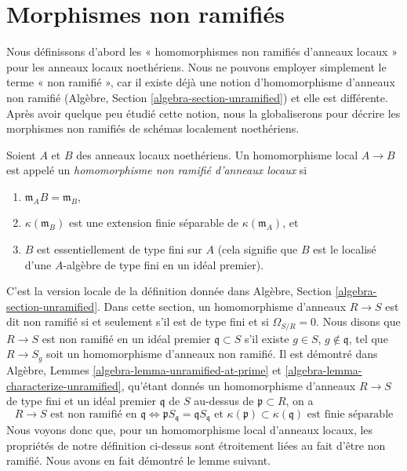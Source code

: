 \section{Morphismes non ramifiés}
\label{section-unramified-definition}

\noindent
Nous définissons d'abord les « homomorphismes non ramifiés d'anneaux locaux » pour les anneaux
locaux noethériens. Nous ne pouvons employer simplement le terme « non ramifié », car il existe déjà
une notion
d'homomorphisme d'anneaux non ramifié (Algèbre, Section \ref{algebra-section-unramified})
et elle est différente. Après avoir quelque peu étudié cette notion, nous
la globaliserons pour décrire les morphismes non ramifiés de schémas localement noethériens.

\begin{definition}
\label{definition-unramified-rings}
Soient $A$ et $B$ des anneaux locaux noethériens. Un homomorphisme local $A \to B$
est appelé un {\it homomorphisme non ramifié d'anneaux locaux} si
\begin{enumerate}
\item $\mathfrak m_AB = \mathfrak m_B$,
\item $\kappa(\mathfrak m_B)$ est une extension finie séparable de
$\kappa(\mathfrak m_A)$, et
\item $B$ est essentiellement de type fini sur $A$ (cela signifie
que $B$ est le localisé d'une $A$-algèbre de type fini en un idéal premier).
\end{enumerate}
\end{definition}

\noindent
C'est la version locale de la
définition donnée dans Algèbre, Section \ref{algebra-section-unramified}.
Dans cette section, un homomorphisme d'anneaux $R \to S$ est dit non ramifié si et
seulement s'il est de type fini et si $\Omega_{S/R} = 0$.
Nous disons que $R \to S$ est non ramifié en un idéal premier $\mathfrak q \subset S$
s'il existe $g \in S$, $g \not \in \mathfrak q$, tel que
$R \to S_g$ soit un homomorphisme d'anneaux non ramifié. Il est démontré dans
Algèbre, Lemmes \ref{algebra-lemma-unramified-at-prime} et
\ref{algebra-lemma-characterize-unramified}, qu'étant donnés un homomorphisme
d'anneaux $R \to S$ de type fini et un idéal premier $\mathfrak q$ de $S$
au-dessus de $\mathfrak p \subset R$, on a
$$
R \to S\text{ est non ramifié en }\mathfrak q
\Leftrightarrow
\mathfrak pS_{\mathfrak q} = \mathfrak q S_{\mathfrak q}
\text{ et }
\kappa(\mathfrak p) \subset \kappa(\mathfrak q)\text{ est finie séparable}
$$
Nous voyons donc que, pour un homomorphisme local d'anneaux locaux, les propriétés
de notre définition ci-dessus sont étroitement liées au fait
d'être non ramifié. Nous avons en fait démontré le lemme suivant.

